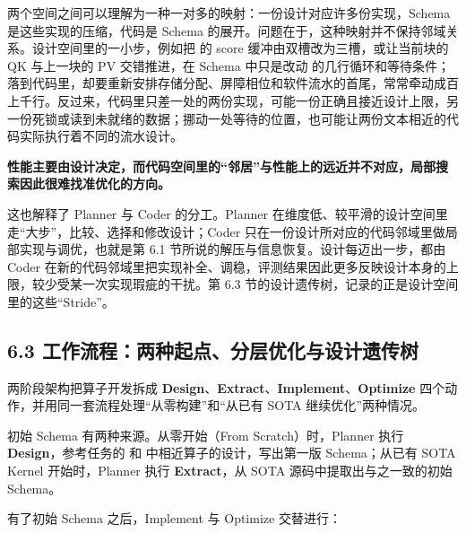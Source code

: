 两个空间之间可以理解为一种一对多的映射：一份设计对应许多份实现，Schema 是这些实现的压缩，代码是 Schema 的展开。问题在于，这种映射并不保持邻域关系。设计空间里的一小步，例如把  的 score 缓冲由双槽改为三槽，或让当前块的 QK 与上一块的 PV 交错推进，在 Schema 中只是改动  的几行循环和等待条件；落到代码里，却要重新安排存储分配、屏障相位和软件流水的首尾，常常牵动成百上千行。反过来，代码里只差一处的两份实现，可能一份正确且接近设计上限，另一份死锁或读到未就绪的数据；挪动一处等待的位置，也可能让两份文本相近的代码实际执行着不同的流水设计。

\textbf{性能主要由设计决定，而代码空间里的“邻居”与性能上的远近并不对应，局部搜索因此很难找准优化的方向。}


\begin{DiagramBlock}
\end{DiagramBlock}
这也解释了 Planner 与 Coder 的分工。Planner 在维度低、较平滑的设计空间里走“大步”，比较、选择和修改设计；Coder 只在一份设计所对应的代码邻域里做局部实现与调优，也就是第 6.1 节所说的解压与信息恢复。设计每迈出一步，都由 Coder 在新的代码邻域里把实现补全、调稳，评测结果因此更多反映设计本身的上限，较少受某一次实现瑕疵的干扰。第 6.3 节的设计遗传树，记录的正是设计空间里的这些“Stride”。


\SourceSeparator
\subsection{6.3 工作流程：两种起点、分层优化与设计遗传树}
两阶段架构把算子开发拆成 \textbf{Design}、\textbf{Extract}、\textbf{Implement}、\textbf{Optimize} 四个动作，并用同一套流程处理“从零构建”和“从已有 SOTA 继续优化”两种情况。


初始 Schema 有两种来源。从零开始（From Scratch）时，Planner 执行 \textbf{Design}，参考任务的  和  中相近算子的设计，写出第一版 Schema；从已有 SOTA Kernel 开始时，Planner 执行 \textbf{Extract}，从 SOTA 源码中提取出与之一致的初始 Schema。


有了初始 Schema 之后，Implement 与 Optimize 交替进行：


